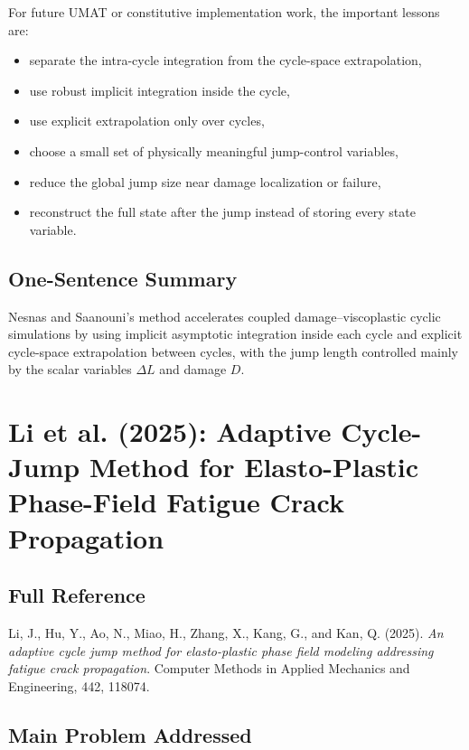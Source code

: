 ﻿\documentclass[11pt,a4paper]{article}
\begin{document}
For future UMAT or constitutive implementation work, the important lessons are:

\begin{itemize}[leftmargin=*]
    \item separate the intra-cycle integration from the cycle-space extrapolation,
    \item use robust implicit integration inside the cycle,
    \item use explicit extrapolation only over cycles,
    \item choose a small set of physically meaningful jump-control variables,
    \item reduce the global jump size near damage localization or failure,
    \item reconstruct the full state after the jump instead of storing every state variable.
\end{itemize}

\subsection{One-Sentence Summary}

Nesnas and Saanouni's method accelerates coupled damage--viscoplastic cyclic simulations by using implicit asymptotic integration inside each cycle and explicit cycle-space extrapolation between cycles, with the jump length controlled mainly by the scalar variables $\Delta L$ and damage $D$.

\section{Li et al. (2025): Adaptive Cycle-Jump Method for Elasto-Plastic Phase-Field Fatigue Crack Propagation}

\subsection{Full Reference}

Li, J., Hu, Y., Ao, N., Miao, H., Zhang, X., Kang, G., and Kan, Q. (2025).
\textit{An adaptive cycle jump method for elasto-plastic phase field modeling addressing fatigue crack propagation}.
Computer Methods in Applied Mechanics and Engineering, 442, 118074.

\subsection{Main Problem Addressed}
\end{document}

